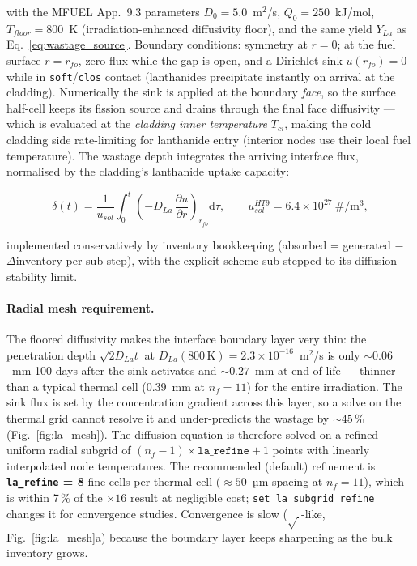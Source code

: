 \begin{refsection}
with the MFUEL App.~9.3 parameters $D_0 = 5.0$~m$^2$/s,
$Q_0 = 250$~kJ/mol, $T_{floor} = 800$~K (irradiation-enhanced diffusivity
floor), and the same yield $Y_{La}$ as
Eq.~\eqref{eq:wastage_source}.  Boundary conditions: symmetry at $r=0$;
at the fuel surface $r = r_{fo}$, zero flux while the gap is open, and a
Dirichlet sink $u(r_{fo}) = 0$ while in \texttt{soft}/\texttt{clos}
contact (lanthanides precipitate instantly on arrival at the cladding).
Numerically the sink is applied at the boundary \emph{face}, so the
surface half-cell keeps its fission source and drains through the final
face diffusivity — which is evaluated at the \emph{cladding inner
temperature} $T_{ci}$, making the cold cladding side rate-limiting for
lanthanide entry (interior nodes use their local fuel temperature).
The wastage depth integrates the arriving interface flux, normalised by
the cladding's lanthanide uptake capacity:

\begin{equation}
  \delta(t) = \frac{1}{u_{sol}} \int_0^t
              \left(-D_{La}\,\frac{\partial u}{\partial r}\right)_{r_{fo}}
              \mathrm{d}\tau,
  \qquad u_{sol}^{HT9} = 6.4\times10^{27}\ \mathrm{\#/m^3},
  \label{eq:la_wastage}
\end{equation}

implemented conservatively by inventory bookkeeping (absorbed = generated
$-$ $\Delta$inventory per sub-step), with the explicit scheme sub-stepped
to its diffusion stability limit.

\paragraph{Radial mesh requirement.}
The floored diffusivity makes the interface boundary layer very thin: the
penetration depth $\sqrt{2 D_{La} t}$ at $D_{La}(800\,\mathrm{K}) =
2.3\times10^{-16}$~m$^2$/s is only ${\sim}0.06$~mm 100 days after the sink
activates and ${\sim}0.27$~mm at end of life — thinner than a typical
thermal cell ($0.39$~mm at $n_f = 11$) for the entire irradiation.  The
sink flux is set by the concentration gradient across this layer, so a
solve on the thermal grid cannot resolve it and under-predicts the wastage
by ${\sim}45$\,\% (Fig.~\ref{fig:la_mesh}).  The diffusion equation is
therefore solved on a refined uniform radial subgrid of
$(n_f - 1)\times\texttt{la\_refine} + 1$ points with linearly interpolated
node temperatures.  The recommended (default) refinement is
\textbf{\texttt{la\_refine} = 8} fine cells per thermal cell
(${\approx}50$~µm spacing at $n_f = 11$), which is within 7\,\% of the
$\times16$ result at negligible cost; \texttt{set\_la\_subgrid\_refine}
changes it for convergence studies.  Convergence is slow
($\sqrt{\,}$-like, Fig.~\ref{fig:la_mesh}a) because the boundary layer
keeps sharpening as the bulk inventory grows.


\end{refsection}
